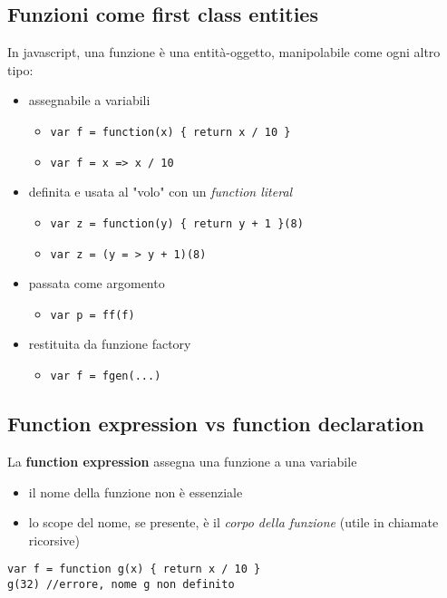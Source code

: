 \subsection{Funzioni come first class entities}
In javascript, una funzione è una entità-oggetto, manipolabile come ogni altro tipo:
\begin{itemize}
    \item assegnabile a variabili
    \begin{itemize}
        \item[] \texttt{var f = function(x) \{ return x / 10 \}}
        \item[] \texttt{var f = x => x / 10}
    \end{itemize}
    \item definita e usata al "volo" con un \textit{function literal}
    \begin{itemize}
        \item[] \texttt{var z = function(y) \{ return y + 1 \}(8)}
        \item[] \texttt{var z = (y = > y + 1)(8)}
    \end{itemize}
    \item passata come argomento
    \begin{itemize}
        \item[] \texttt{var p = ff(f)}
    \end{itemize}
    \item restituita da funzione factory
    \begin{itemize}
        \item[] \texttt{var f = fgen(...)}
    \end{itemize}
\end{itemize}

\subsection{Function expression vs function declaration}
La \textbf{function expression} assegna una funzione a una variabile
\begin{itemize}
    \item il nome della funzione non è essenziale
    \item lo scope del nome, se presente, è il \textit{corpo della funzione} (utile in chiamate ricorsive)
\end{itemize}
\begin{verbatim}
var f = function g(x) { return x / 10 }
g(32) //errore, nome g non definito
\end{verbatim}

